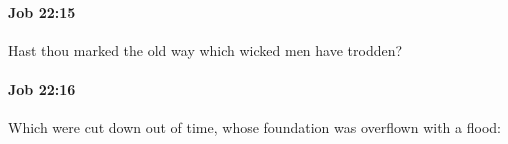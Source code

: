 		\paragraph{Job 22:15} %
			\label{JOB-22-15}

			Hast thou marked the old way which wicked men have trodden?


		\paragraph{Job 22:16} %
			\label{JOB-22-16}

			Which were cut down out of time, whose foundation was overflown with a flood:


